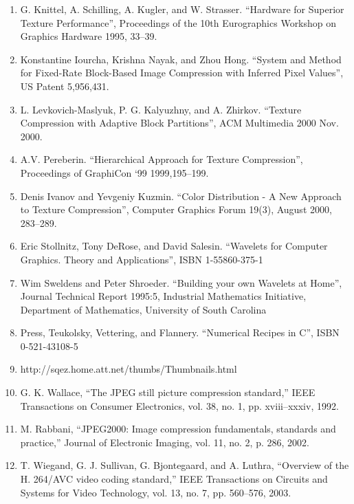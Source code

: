 \documentclass{article}
\begin{document}
\begin{enumerate}
	\item G. Knittel, A. Schilling, A. Kugler, and W. Strasser.
	“Hardware for Superior Texture Performance”, Proceedings of the 10th Eurographics Workshop on Graphics Hardware 1995, 33–39.

	\item Konstantine Iourcha, Krishna Nayak, and Zhou Hong.
	“System and Method for Fixed-Rate Block-Based Image Compression with Inferred Pixel Values”, US
	Patent 5,956,431.

	\item L. Levkovich-Maslyuk, P. G. Kalyuzhny, and A.
	Zhirkov. “Texture Compression with Adaptive Block
	Partitions”, ACM Multimedia 2000 Nov. 2000.

	\item A.V. Pereberin. “Hierarchical Approach for Texture Compression”, Proceedings of GraphiCon ‘99
	1999,195–199.
	
	\item Denis Ivanov and Yevgeniy Kuzmin. “Color Distribution - A New Approach to Texture Compression”, Computer Graphics Forum 19(3), August 2000, 283–289.
	
	\item Eric Stollnitz, Tony DeRose, and David Salesin.
	“Wavelets for Computer Graphics. Theory and Applications”, ISBN 1-55860-375-1
	\item Wim Sweldens and Peter Shroeder. “Building your own
	Wavelets at Home”, Journal Technical Report 1995:5,	Industrial Mathematics Initiative, Department of Mathematics, University of South Carolina

	\item Press, Teukolsky, Vettering, and Flannery. “Numerical
	Recipes in C”, ISBN 0-521-43108-5
	
	\item http://sqez.home.att.net/thumbs/Thumbnails.html
	
	\item G. K. Wallace, “The JPEG still picture compression standard,” IEEE
	Transactions on Consumer Electronics, vol. 38, no. 1, pp. xviii–xxxiv,
	1992.
	
	\item M. Rabbani, “JPEG2000: Image compression fundamentals, standards
	and practice,” Journal of Electronic Imaging, vol. 11, no. 2, p. 286,
	2002.
	
	\item T. Wiegand, G. J. Sullivan, G. Bjontegaard, and A. Luthra, “Overview of
	the H. 264/AVC video coding standard,” IEEE Transactions on Circuits
	and Systems for Video Technology, vol. 13, no. 7, pp. 560–576, 2003.
	

\end{enumerate}
\end{document}
